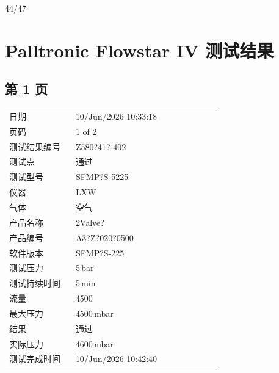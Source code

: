\documentclass[UTF8,10pt,a4paper,fontset=fandol]{ctexart}
\newcommand{\fieldvalue}[1]{#1}
\newcommand{\handwritten}[1]{#1}
\begin{document}
\fieldvalue{\handwritten{44/47}}

\newpage

\section*{Palltronic Flowstar IV 测试结果}

\subsection*{第 1 页}

\begin{tabular}{@{}p{0.28\linewidth}p{0.62\linewidth}@{}}
日期 &
\fieldvalue{10/Jun/2026 10:33:18}
\\
页码 &
\fieldvalue{1 of 2}
\\
测试结果编号 &
\fieldvalue{Z580?41?-402}
\\
测试点 &
\fieldvalue{通过}
\\
测试型号 &
\fieldvalue{SFMP?S-5225}
\\
仪器 &
\fieldvalue{LXW}
\\
气体 &
\fieldvalue{空气}
\\
产品名称 &
\fieldvalue{2Valve?}
\\
产品编号 &
\fieldvalue{A3?Z?020?0500}
\\
软件版本 &
\fieldvalue{SFMP?S-225}
\\
测试压力 &
\fieldvalue{5\,bar}
\\
测试持续时间 &
\fieldvalue{5\,min}
\\
流量 &
\fieldvalue{4500}
\\
最大压力 &
\fieldvalue{4500\,mbar}
\\
结果 &
\fieldvalue{通过}
\\
实际压力 &
\fieldvalue{4600\,mbar}
\\
测试完成时间 &
\fieldvalue{10/Jun/2026 10:42:40}
\\
\end{tabular}
\end{document}
